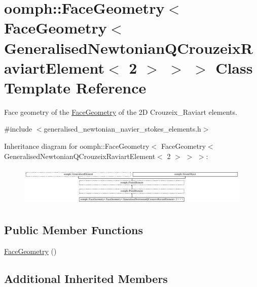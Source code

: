 \hypertarget{classoomph_1_1FaceGeometry_3_01FaceGeometry_3_01GeneralisedNewtonianQCrouzeixRaviartElement_3_012_01_4_01_4_01_4}{}\section{oomph\+:\+:Face\+Geometry$<$ Face\+Geometry$<$ Generalised\+Newtonian\+Q\+Crouzeix\+Raviart\+Element$<$ 2 $>$ $>$ $>$ Class Template Reference}
\label{classoomph_1_1FaceGeometry_3_01FaceGeometry_3_01GeneralisedNewtonianQCrouzeixRaviartElement_3_012_01_4_01_4_01_4}


Face geometry of the \hyperlink{classoomph_1_1FaceGeometry}{Face\+Geometry} of the 2D Crouzeix\+\_\+\+Raviart elements.  




{\ttfamily \#include $<$generalised\+\_\+newtonian\+\_\+navier\+\_\+stokes\+\_\+elements.\+h$>$}

Inheritance diagram for oomph\+:\+:Face\+Geometry$<$ Face\+Geometry$<$ Generalised\+Newtonian\+Q\+Crouzeix\+Raviart\+Element$<$ 2 $>$ $>$ $>$\+:\begin{figure}[H]
\begin{center}
\leavevmode
\includegraphics[height=1.934370cm]{classoomph_1_1FaceGeometry_3_01FaceGeometry_3_01GeneralisedNewtonianQCrouzeixRaviartElement_3_012_01_4_01_4_01_4}
\end{center}
\end{figure}
\subsection*{Public Member Functions}
\begin{DoxyCompactItemize}
\item 
\hyperlink{classoomph_1_1FaceGeometry_3_01FaceGeometry_3_01GeneralisedNewtonianQCrouzeixRaviartElement_3_012_01_4_01_4_01_4_a4c83f5ec3c93fb63078eaac71a8765cd}{Face\+Geometry} ()
\end{DoxyCompactItemize}
\subsection*{Additional Inherited Members}


